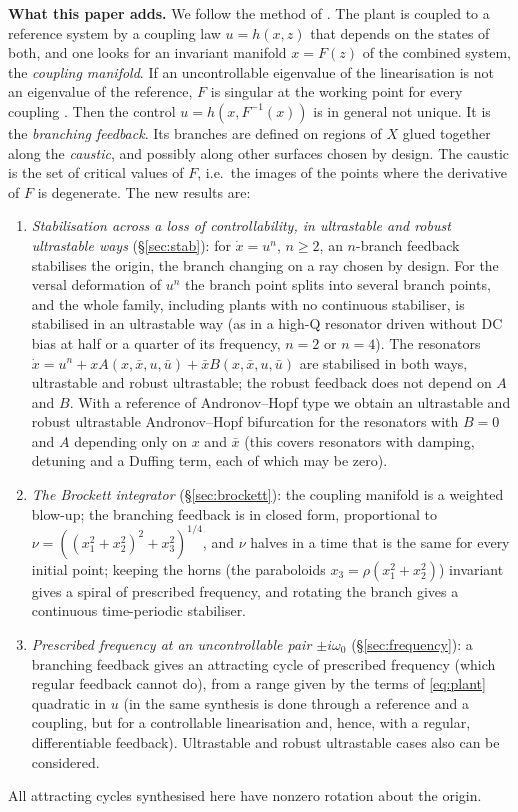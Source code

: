 \documentclass[11pt,reqno]{amsart}
\theoremstyle{plain}
\theoremstyle{remark}
\theoremstyle{definition}
\begin{document}
\medskip
\noindent\textbf{What this paper adds.}
We follow the method of \cite{Shosh1988,Shosh1990,Shosh1991,Shosh1992}. The plant is coupled to a reference system by a coupling law $u=h(x,z)$ that depends on the states of both, and one looks for an invariant manifold $x=F(z)$ of the combined system, the \emph{coupling manifold}. If an uncontrollable eigenvalue of the linearisation is not an eigenvalue of the reference, $F$ is singular at the working point for every coupling \cite[Cor.~2.7]{Shosh1990}. Then the control $u=h(x,F^{-1}(x))$ is in general not unique. It is the \emph{branching feedback}. Its branches are defined on regions of $X$ glued together along the \emph{caustic}, and possibly along other surfaces chosen by design. The caustic is the set of critical values of $F$, i.e.\ the images of the points where the derivative of $F$ is degenerate. The new results are:
\begin{enumerate}
\item[(1)] \emph{Stabilisation across a loss of controllability, in ultrastable and robust ultrastable ways} (\S\ref{sec:stab}): for $\dot x=u^{n}$, $n\ge2$, an $n$-branch feedback stabilises the origin, the branch changing on a ray chosen by design. For the versal deformation of $u^{n}$ the branch point splits into several branch points, and the whole family, including plants with no continuous stabiliser, is stabilised in an ultrastable way (as in a high-Q resonator driven without DC bias at half or a quarter of its frequency, $n=2$ or $n=4$). The resonators $\dot x=u^{n}+xA(x,\bar x,u,\bar u)+\bar xB(x,\bar x,u,\bar u)$ are stabilised in both ways, ultrastable and robust ultrastable; the robust feedback does not depend on $A$ and $B$. With a reference of Andronov--Hopf type we obtain an ultrastable and robust ultrastable Andronov--Hopf bifurcation for the resonators with $B=0$ and $A$ depending only on $x$ and $\bar x$ (this covers resonators with damping, detuning and a Duffing term, each of which may be zero).
\item[(2)] \emph{The Brockett integrator} (\S\ref{sec:brockett}): the coupling manifold is a weighted blow-up; the branching feedback is in closed form, proportional to $\nu=((x_1^2+x_2^2)^2+x_3^2)^{1/4}$, and $\nu$ halves in a time that is the same for every initial point; keeping the horns (the paraboloids $x_3=\rho(x_1^2+x_2^2)$) invariant gives a spiral of prescribed frequency, and rotating the branch gives a continuous time-periodic stabiliser.
\item[(3)] \emph{Prescribed frequency at an uncontrollable pair $\pm i\omega_0$} (\S\ref{sec:frequency}): a branching feedback gives an attracting cycle of prescribed frequency (which regular feedback cannot do), from a range given by the terms of \eqref{eq:plant} quadratic in $u$ (in \cite[\S5]{Shosh1990} the same synthesis is done through a reference and a coupling, but for a controllable linearisation and, hence, with a regular, differentiable feedback). Ultrastable and robust ultrastable cases also can be considered.
\end{enumerate}
All attracting cycles synthesised here have nonzero rotation about the origin.
\end{document}
